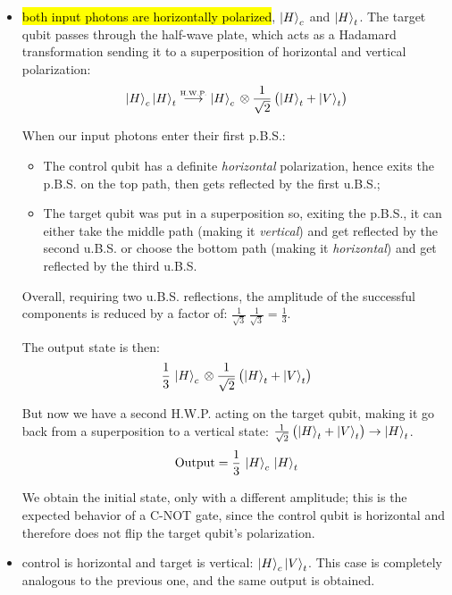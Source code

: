 \begin{itemize}

\item[\textbf{CASE \Rnum{1}:}] \hl{both input photons are horizontally polarized}, $\ket{H}_c$ and $\ket{H}_t$. The target qubit passes through the half-wave plate, which acts as a Hadamard transformation sending it to a superposition of horizontal and vertical polarization:
\begin{equation}
\ket{H}_c\ket{H}_t 
\stackrel{\text{\tiny{H.W.P.}}}{\longrightarrow} 
\ket{H}_c \, 
\otimes
\frac{1}{\sqrt{2}}\, 
\bigl( 
    \ket{H}_t+\ket{V}_t
\bigr)
\end{equation}

When our input photons enter their first p.B.S.:

\begin{itemize}
    \item The control qubit has a definite \emph{horizontal} polarization, hence exits the p.B.S. on the top path, then gets reflected by the first u.B.S.;
    \item The target qubit was put in a superposition so, exiting the p.B.S., it can either take the middle path (making it \emph{vertical}) and get reflected by the second u.B.S. or choose the bottom path (making it \emph{horizontal}) and get reflected by the third u.B.S.
\end{itemize}

Overall, requiring two u.B.S. reflections, the amplitude of the successful components is reduced by a factor of: $\frac{1}{\sqrt{3}}\, \frac{1}{\sqrt{3}}= \frac{1}{3}$.

The output state is then:
\begin{equation}
\frac{1}{3}\, \ket{H}_c \,
\otimes
\frac{1}{\sqrt{2}} \,
\bigl( \ket{H}_t+\ket{V}_t\bigr)
\end{equation}

But now we have a second H.W.P. acting on the target qubit, making it go back from a superposition to a vertical state: $\tfrac{1}{\sqrt{2}}  \, \bigl( \ket{H}_t+\ket{V}_t\bigr)\to \ket{H}_t$.
\begin{equation}
\text{Output} = \frac{1}{3}\, \ket{H}_c\, \ket{H}_t
\end{equation}

We obtain the initial state, only with a different amplitude; this is the expected behavior of a C-NOT gate, since the control qubit is horizontal and therefore does not flip the target qubit's polarization.

\item[\textbf{CASE \Rnum{2}:}] control is horizontal and target is vertical: $\ket{H}_c\ket{V}_t$. This case is completely analogous to the previous one, and the same output is obtained.


\end{itemize}
